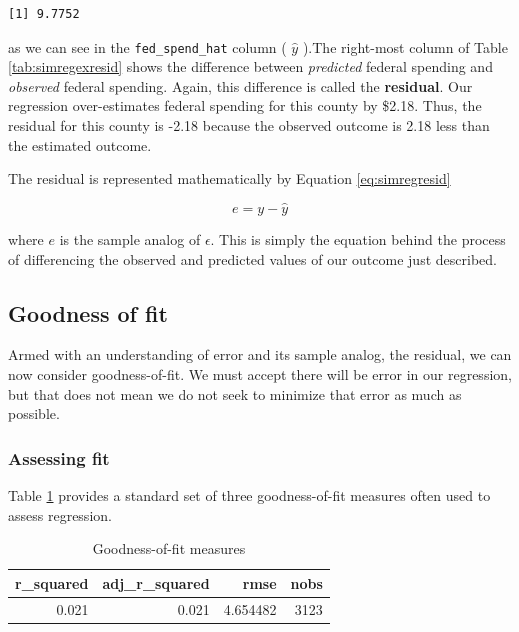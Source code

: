 \documentclass[
]{book}
\begin{document}
\begin{verbatim}
[1] 9.7752
\end{verbatim}

as we can see in the \texttt{fed\_spend\_hat} column ( \(\hat{y}\) ).The right-most column of Table \ref{tab:simregexresid} shows the difference between \emph{predicted} federal spending and \emph{observed} federal spending. Again, this difference is called the \textbf{residual}. Our regression over-estimates federal spending for this county by \$2.18. Thus, the residual for this county is -2.18 because the observed outcome is 2.18 less than the estimated outcome.

The residual is represented mathematically by Equation \eqref{eq:simregresid}

\begin{equation}
e = y - \hat{y}
\label{eq:simregresid}
\end{equation}

where \(e\) is the sample analog of \(\epsilon\). This is simply the equation behind the process of differencing the observed and predicted values of our outcome just described.

\hypertarget{goodness-of-fit}{%
\subsection{Goodness of fit}\label{goodness-of-fit}}

Armed with an understanding of error and its sample analog, the residual, we can now consider goodness-of-fit. We must accept there will be error in our regression, but that does not mean we do not seek to minimize that error as much as possible.

\hypertarget{assessing-fit}{%
\subsubsection*{Assessing fit}\label{assessing-fit}}


Table \ref{tab:simregexfit} provides a standard set of three goodness-of-fit measures often used to assess regression.

\begin{table}

\caption{\label{tab:simregexfit}Goodness-of-fit measures}
\centering
\begin{tabular}[t]{r|r|r|r}
\hline
r\_squared & adj\_r\_squared & rmse & nobs\\
\hline
0.021 & 0.021 & 4.654482 & 3123\\
\hline
\end{tabular}
\end{table}
\end{document}
